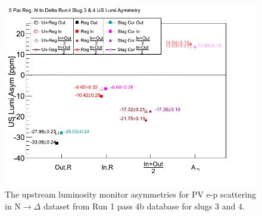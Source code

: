 \begin{singlespace}
\begin{figure}[!h]
	\begin{center}
	\includegraphics[width=15.0cm]{figures/n2DeltaUSLumiSummaryPlotReg5}
	\end{center}
	\caption
	{The upstream luminosity monitor asymmetries for PV e-p scattering in N$\rightarrow\Delta$ dataset from Run 1 pass 4b database for slugs 3 and 4.}
	\label{fig:n2DeltaUSLumiSummaryPlotReg5}
\end{figure}
\end{singlespace}


